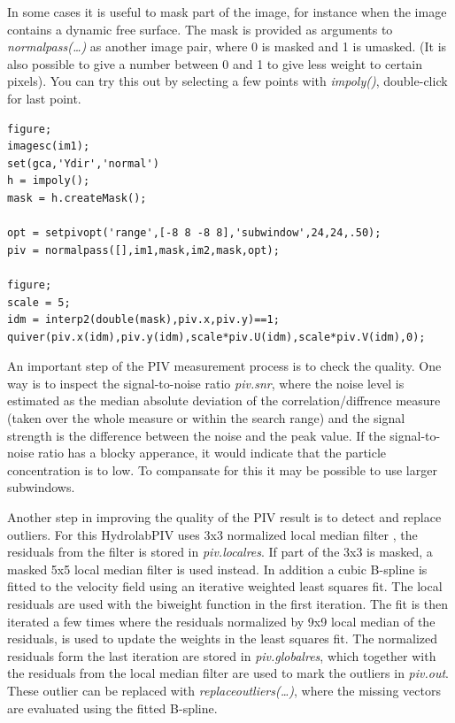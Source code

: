 \documentclass[10pt]{article}
\begin{document}
In some cases it is useful to mask part of the image,
for instance when the image contains a dynamic free surface. 
The mask is provided as arguments to \emph{normalpass(\ldots)} as another image pair, where 0 is masked and 1 is umasked.
(It is also possible to give a number between 0 and 1 to give less weight to certain pixels).
You can try this out by selecting a few points with \emph{impoly()}, double-click for last point.
\begin{lstlisting}[caption=Single pass PIV with Masking,label=xx] 
% create a polygonal mask 
figure;
imagesc(im1);
set(gca,'Ydir','normal')
h = impoly();
mask = h.createMask();

opt = setpivopt('range',[-8 8 -8 8],'subwindow',24,24,.50); 
piv = normalpass([],im1,mask,im2,mask,opt); 

figure;
scale = 5;
idm = interp2(double(mask),piv.x,piv.y)==1;
quiver(piv.x(idm),piv.y(idm),scale*piv.U(idm),scale*piv.V(idm),0);
\end{lstlisting}

An important step of the PIV measurement process is to check the quality. 
One way is to inspect the signal-to-noise ratio  \emph{piv.snr},
where the noise level is estimated as the median absolute deviation of the correlation/diffrence measure (taken over the whole measure or within the search range)
and the signal strength is the difference between the noise and the peak value.
If the signal-to-noise ratio has a blocky apperance, it would indicate that the particle concentration is to low.
To compansate for this it may be possible to use larger subwindows.
  
Another step in improving the quality of the PIV result is to detect and replace outliers.
For this HydrolabPIV uses 3x3 normalized local median filter \citep{Westerweel2005},
the residuals from the filter is stored in \emph{piv.localres}.
If part of the 3x3 is masked, a masked 5x5 local median filter is used instead.
%
In addition a cubic B-spline is fitted to the velocity field using an iterative weighted least squares fit.
The local residuals are used with the biweight function in the first iteration.
The fit is then iterated a few times where
the residuals normalized by 9x9 local median of the residuals, 
is used to update the weights in the least squares fit.
The normalized residuals form the last iteration are stored in \emph{piv.globalres},
which together with the residuals from the local median filter are used to mark the outliers in \emph{piv.out}.
These outlier can be replaced with \emph{replaceoutliers(\ldots)}, where the missing vectors are evaluated using the fitted B-spline.
\end{document}
